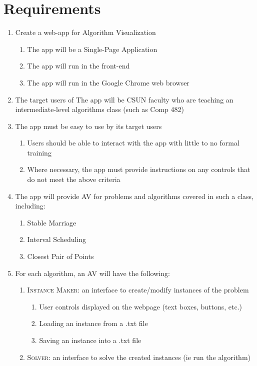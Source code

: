 \section{Requirements}
\label{requirements}
\begin{enumerate}
	\item Create a web-app for Algorithm Visualization 
	\begin{enumerate}
		\item The app will be a Single-Page Application
		\item The app will run in the front-end
		\item The app will run in the Google Chrome web browser
	\end{enumerate}
	\item The target users of The app will be CSUN faculty 
	who are teaching an intermediate-level 
	algorithms class (such as Comp 482)
	\item The app must be easy to use by its target users
	\begin{enumerate}
		\item Users should be able to interact with the app with 
			little to no formal training
		\item Where necessary, the app must provide instructions on 
			any controls that do not meet the above criteria
	\end{enumerate}
	\item The app will provide AV for problems and algorithms
		covered in such a class, including: 
		\begin{enumerate}
			\item Stable Marriage
			\item Interval Scheduling
			\item Closest Pair of Points
		\end{enumerate}
	\item For each algorithm, an AV will have the following:
	\begin{enumerate}
		\item \textsc{Instance Maker}: an interface to create/modify instances of the problem
		\begin{enumerate}
			\item User controls displayed on the webpage (text boxes, buttons, etc.)
			\item Loading an instance from a .txt file\label{req-load}
			\item Saving an instance into a .txt file\label{req-save}
		\end{enumerate}
		\item \textsc{Solver}: an interface to solve the created instances (ie run the algorithm)

\end{enumerate}
\end{enumerate}

